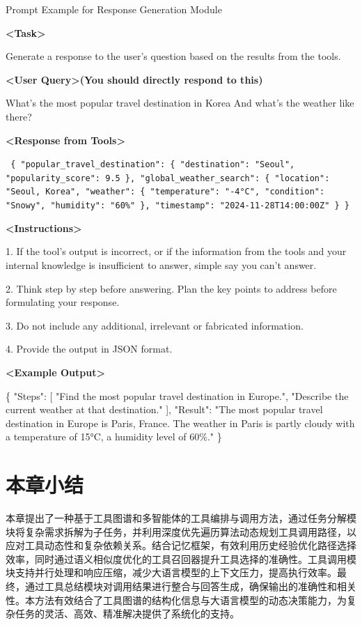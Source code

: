 \begin{table}[H]
  \centering
  \caption{工具响应总结模块prompt构建示例}{Prompt Example for Response Generation Module} %
  \label{tab:tool-summary} %
\begin{tcolorbox}[colback=bgcolor, colframe=black, width=0.95\textwidth, boxrule=0.5mm, 
coltitle=white, colbacktitle=titlecolor, title=An Example for Response Generation with GPT-4]


\textbf{<Task>} 

Generate a response to the user's question based on the results from the tools.

\textbf{<User Query>(You should directly respond to this)}

What's the most popular travel destination in Korea And what's the weather like there?

\textbf{<Response from Tools>} 

\texttt{%
\{ "popular\_travel\_destination": \{ "destination": "Seoul", "popularity\_score": 9.5 \}, 
  "global\_weather\_search": \{ "location": "Seoul, Korea", 
    "weather": \{ "temperature": "-4°C", "condition": "Snowy", "humidity": "60\%" \}, 
    "timestamp": "2024-11-28T14:00:00Z" \} 
\}%
}

\textbf{<Instructions>}

1. If the tool's output is incorrect, or if the information from the tools and your internal knowledge is insufficient to answer, simple say you can't answer.

2. Think step by step before answering. Plan the key points to address before formulating your response.

3. Do not include any additional, irrelevant or fabricated information.

4. Provide the output in JSON format.

\textbf{<Example Output>}  

\{%
    "Steps": [%
        "Find the most popular travel destination in Europe.",%
        "Describe the current weather at that destination."%
    ],%
    "Result": "The most popular travel destination in Europe is Paris, France. The weather in Paris is partly cloudy with a temperature of 15°C, a humidity level of 60\%."%
\}

\end{tcolorbox}
\end{table}

\section{本章小结}
\label{sec:summary_chap4}

本章提出了一种基于工具图谱和多智能体的工具编排与调用方法，通过任务分解模块将复杂需求拆解为子任务，并利用深度优先遍历算法动态规划工具调用路径，以应对工具动态性和复杂依赖关系。结合记忆框架，有效利用历史经验优化路径选择效率，同时通过语义相似度优化的工具召回器提升工具选择的准确性。工具调用模块支持并行处理和响应压缩，减少大语言模型的上下文压力，提高执行效率。最终，通过工具总结模块对调用结果进行整合与回答生成，确保输出的准确性和相关性。本方法有效结合了工具图谱的结构化信息与大语言模型的动态决策能力，为复杂任务的灵活、高效、精准解决提供了系统化的支持。